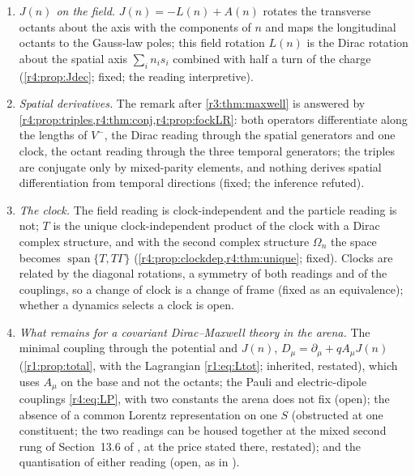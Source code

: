 \begin{enumerate}[label=(\arabic*),leftmargin=2.2em]
does not have. $T$ is the clock-independent factor of every Dirac kernel; the couplings are conjugated by the rotation that moves the clock, and an odd
permutation paired with the spatial one reverses the electric-dipole term with $T$ but not the Pauli term, and the temporal one alone reverses
neither (\cref{r4:prop:coupclock}; fixed, (E2) refuted for the Pauli term).
\item \emph{$J(n)$ on the field.} $J(n)=-L(n)+A(n)$ rotates the transverse octants about the axis with the components of $n$ and maps the
longitudinal octants to the Gauss-law poles; this field rotation $L(n)$ is the Dirac rotation about the spatial axis $\sum_in_is_i$ combined with
half a turn of the charge (\cref{r4:prop:Jdec}; fixed; the reading interpretive).
\item \emph{Spatial derivatives.} The remark after \cref{r3:thm:maxwell} is answered by \cref{r4:prop:triples,r4:thm:conj,r4:prop:fockLR}: both operators
differentiate along the lengths of $V^-$, the Dirac reading through the spatial generators and one clock, the octant reading through the three temporal
generators; the triples are conjugate only by mixed-parity elements, and nothing derives spatial differentiation from temporal directions (fixed; the
inference refuted).
\item \emph{The clock.} The field reading is clock-independent and the particle reading is not; $T$ is the unique clock-independent product of the
clock with a Dirac complex structure, and with the second complex structure $\Omega_n$ the space becomes $\operatorname{span}\{T,T\Gamma\}$ (\cref{r4:prop:clockdep,r4:thm:unique};
fixed). Clocks are related by the diagonal rotations, a symmetry of both readings and of the couplings, so a change of clock is a change of frame
(fixed as an equivalence); whether a dynamics selects a clock is open.
\item \emph{What remains for a covariant Dirac--Maxwell theory in the arena.} The minimal coupling through the potential and $J(n)$, $D_\mu=\partial_\mu+qA_\mu J(n)$
(\cref{r1:prop:total}, with the Lagrangian \cref{r1:eq:Ltot}; inherited, restated), which uses $A_\mu$ on the base and not the octants; the Pauli and electric-dipole couplings
\cref{r4:eq:LP}, with two constants the arena does not fix (open); the absence of a common Lorentz representation on one $S$ (obstructed at one constituent;
the two readings can be housed together at the mixed second rung of Section~13.6 of \cite{ES17}, at the price stated there, restated); and the
quantisation of either reading (open, as in \cite{FMB}).
\end{enumerate}

